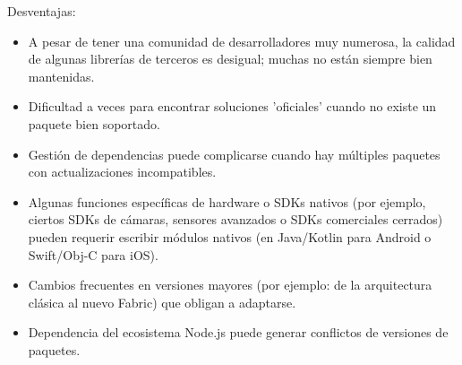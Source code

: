 Desventajas:
\begin{itemize}
    \item A pesar de tener una comunidad de desarrolladores muy numerosa, la calidad de algunas librerías de terceros es desigual; muchas no están siempre bien mantenidas.
    \item Dificultad a veces para encontrar soluciones 'oficiales' cuando no existe un paquete bien soportado.
    \item Gestión de dependencias puede complicarse cuando hay múltiples paquetes con actualizaciones incompatibles.
    \item Algunas funciones específicas de hardware o SDKs nativos (por ejemplo, ciertos SDKs de cámaras, sensores avanzados o SDKs comerciales cerrados) pueden requerir escribir módulos nativos (en Java/Kotlin para Android o Swift/Obj-C para iOS).
    \item Cambios frecuentes en versiones mayores (por ejemplo: de la arquitectura clásica al nuevo Fabric) que obligan a adaptarse.
    \item Dependencia del ecosistema Node.js puede generar conflictos de versiones de paquetes.
\end{itemize}


